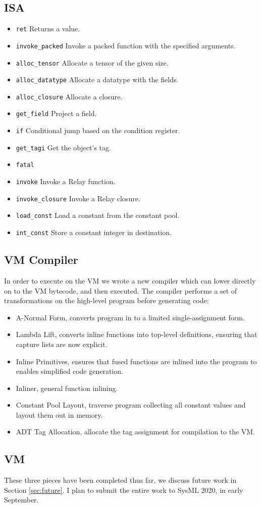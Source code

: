 \subsection{ISA}
\begin{itemize}
    \item \verb|ret| Returns a value.
    \item \verb|invoke_packed| Invoke a packed function with the specified arguments.
    \item \verb|alloc_tensor| Allocate a tensor of the given size.
    \item \verb|alloc_datatype| Allocate a datatype with the fields.
    \item \verb|alloc_closure| Allocate a closure.
    \item \verb|get_field| Project a field.
    \item \verb|if| Conditional jump based on the condition register.
    \item \verb|get_tagi| Get the object's tag.
    \item \verb|fatal|
    \item \verb|invoke| Invoke a Relay function.
    \item \verb|invoke_closure| Invoke a Relay closure.
    \item \verb|load_const| Load a constant from the constant pool.
    \item \verb|int_const| Store a constant integer in destination.

\end{itemize}
\subsection{VM Compiler}

In order to execute on the VM we wrote a new compiler which
  can lower \relay directly on to the VM bytecode, and then
  executed.
The compiler performs a set of transformations on the high-level
  \relay program before generating code:
\begin{itemize}
  \item A-Normal Form, converts program in to a limited single-assignment form.
  \item Lambda Lift, converts inline functions into top-level definitions,
        ensuring that capture lists are now explicit.
  \item Inline Primitives, ensures that fused functions are inlined into
        the program to enables simplified code generation.
  \item Inliner, general function inlining.
  \item Constant Pool Layout, traverse program collecting all constant values
        and layout them out in memory.
  \item ADT Tag Allocation, allocate the tag assignment for compilation
        to the VM.
\end{itemize}

\subsection{VM}

These three pieces have been completed thus far, we discuss future work in Section
\ref{sec:future}. I plan to submit the entire work to SysML 2020, in early September.
